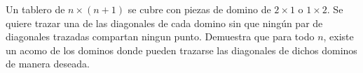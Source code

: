 \begin{problem}
    Un tablero de $n\times (n+1)$ se cubre con piezas de domino de $2\times1$ o $1\times2$. Se quiere trazar una de las diagonales de cada domino sin que ning\'un par de diagonales trazadas compartan ningun punto. 
    Demuestra que para todo $n$, existe un acomo de los dominos donde pueden trazarse las diagonales de dichos dominos de manera deseada. 

    \label{24JALTSTF4}
\end{problem}